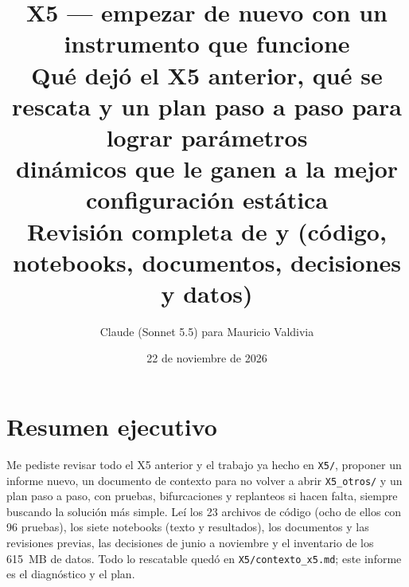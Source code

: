 \documentclass[11pt,a4paper]{article}
\title{\vspace{-1.6cm}\textbf{X5 — empezar de nuevo con un instrumento que funcione}\\[6pt]
  \large Qué dejó el X5 anterior, qué se rescata y un plan paso a paso para lograr parámetros\\
  dinámicos que le ganen a la mejor configuración estática\\[4pt]
  \normalsize\color{cgris} Revisión completa de \code{X5\_otros/} y \code{X5/} (código, notebooks, documentos, decisiones y datos)}
\author{Claude (Sonnet 5.5) para Mauricio Valdivia}
\date{22 de noviembre de 2026}
\newcommand{\code}[1]{\texttt{\small #1}}
\begin{document}
\maketitle
\vspace{-0.6cm}

\section*{Resumen ejecutivo}

Me pediste revisar todo el X5 anterior y el trabajo ya hecho en \code{X5/}, proponer un informe nuevo,
un documento de contexto para no volver a abrir \code{X5\_otros/} y un plan paso a paso, con pruebas,
bifurcaciones y replanteos si hacen falta, siempre buscando la solución más simple. Leí los 23 archivos de
código (ocho de ellos con 96 pruebas), los siete notebooks (texto y resultados), los documentos y las
revisiones previas, las decisiones de junio a noviembre y el inventario de los 615~MB de datos. Todo lo rescatable quedó en
\code{X5/contexto\_x5.md}; este informe es el diagnóstico y el plan.
\end{document}
